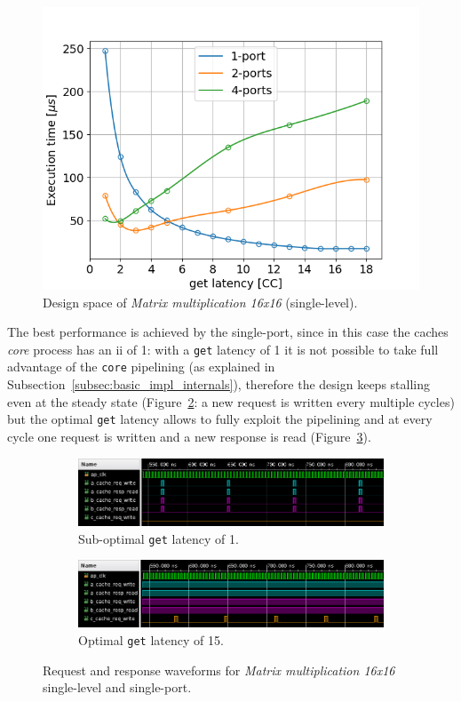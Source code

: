 \documentclass[11pt,a4paper,oneside]{memoir}
\begin{document}
\begin{figure}[H]
	\centering
	\includegraphics[width=.7\textwidth]{matmul_16_multiport_latency}
	\caption{Design space of \emph{Matrix multiplication 16x16}
	(single-level).}
	\label{fig:matmul_16_no_l1_space}
\end{figure}

The best performance is achieved by the single-port, since in this case the
caches \emph{core} process has an \ac{ii} of 1: with a \texttt{get} latency of
1 it is not possible to take full advantage of the \texttt{core} pipelining (as
explained in Subsection~\ref{subsec:basic_impl_internals}), therefore the
design keeps stalling even at the steady state
(Figure~\ref{subfig:matmul_wf_latency_1}: a new request is written every
multiple cycles) but the optimal \texttt{get} latency allows to fully exploit
the pipelining and at every cycle one request is written and a new response is
read (Figure~\ref{subfig:matmul_wf_latency_15}). 

\begin{figure}[H]
	\centering
	\begin{subfigure}[b]{.85\textwidth}
		\centering
		\includegraphics[width=\textwidth]{matmul_latency_1}
		\caption{Sub-optimal \texttt{get} latency of 1.}
		\label{subfig:matmul_wf_latency_1}
	\end{subfigure}
	\begin{subfigure}[b]{.85\textwidth}
		\centering
		\includegraphics[width=\textwidth]{matmul_latency_15}
		\caption{Optimal \texttt{get} latency of 15.}
		\label{subfig:matmul_wf_latency_15}
	\end{subfigure}
	\caption{Request and response waveforms for \emph{Matrix multiplication
	16x16} single-level and single-port.}
	\label{fig:matmul_wf}
\end{figure}
\end{document}
